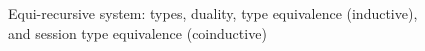\begin{figure}[tp]
\begin{mathpar}
  \end{mathpar}
  \caption{Equi-recursive system: types, duality, type equivalence (inductive),
  and session type equivalence (coinductive)}
  \label{fig:equi-equivalence}
\end{figure}

